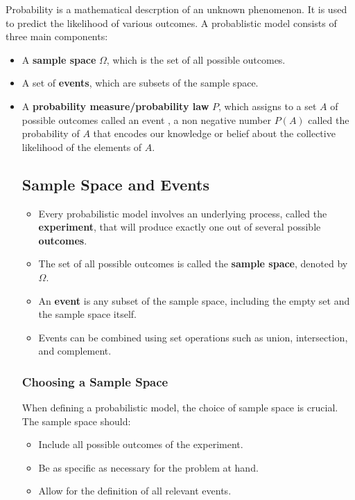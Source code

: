 Probability is a mathematical descrption of an unknown phenomenon. It is used to predict the likelihood of various outcomes. A probablistic model consists of three main components:
\begin{itemize}
    \item A \textbf{sample space} \( \Omega \), which is the set of all possible outcomes.
    \item A set of \textbf{events}, which are subsets of the sample space.
    \item A \textbf{probability measure/probability law} \( P \), which assigns to a set \(A\) of possible outcomes called an event , a non negative number \( P(A) \) called the probability of \(A\) that encodes our knowledge or belief about the collective likelihood of the elements of \(A\). 

\subsection{Sample Space and Events}
\begin{itemize}
    \item Every probabilistic model involves an underlying process, called the \textbf{experiment}, that will produce exactly one out of several possible \textbf{outcomes}.
    \item The set of all possible outcomes is called the \textbf{sample space}, denoted by \( \Omega \).
    \item An \textbf{event} is any subset of the sample space, including the empty set and the sample space itself.
    \item Events can be combined using set operations such as union, intersection, and complement.
\end{itemize}

\subsubsection{Choosing a Sample Space}
When defining a probabilistic model, the choice of sample space is crucial. The sample space should:
\begin{itemize}
    \item Include all possible outcomes of the experiment.
    \item Be as specific as necessary for the problem at hand.
    \item Allow for the definition of all relevant events.
\end{itemize}


\end{itemize}
